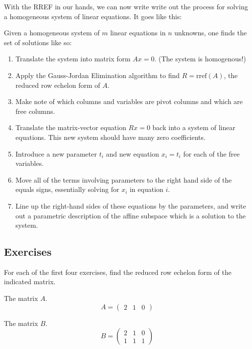\documentclass[elementsmain.tex]{subfiles}
\begin{document}
With the RREF in our hands, we can now write write out the process for solving a homogeneous system of linear equations. It goes like this:

Given a homogeneous system of $m$ linear equations in $n$ unknowns, one finds the set of solutions like so:

\begin{enumerate}
\item Translate the system into matrix form $Ax=0$. (The system is homogenous!)
\item Apply the Gauss-Jordan Elimination algorithm to find $R=\mathrm{rref}(A)$, the reduced row echelon form of $A$.
\item Make note of which columns and variables are pivot columns and which are free columns.
\item Translate the matrix-vector equation $Rx=0$ back into a system of linear equations. This new system should have many zero coefficients.
\item Introduce a new parameter $t_i$ and new equation $x_i = t_i$ for each of the free variables.
\item Move all of the terms involving parameters to the right hand side of the equals signs, essentially solving for $x_i$ in equation $i$.
\item Line up the right-hand sides of these equations by the parameters, and write out a parametric description of the affine subspace which is a solution to the system.
\end{enumerate}





\clearpage
\subsection*{Exercises}

For each of the first four exercises, find the reduced row echelon form of the indicated matrix.

\begin{exercise} The matrix $A$.
\begin{equation*}
A = \begin{pmatrix} 2 & 1 & 0 \end{pmatrix}
\end{equation*}
\end{exercise}

\begin{exercise} The matrix $B$.
\begin{equation*}
B = \begin{pmatrix} 2 & 1 & 0 \\ 1 & 1 & 1 \end{pmatrix}
\end{equation*}
\end{exercise}
\end{document}
